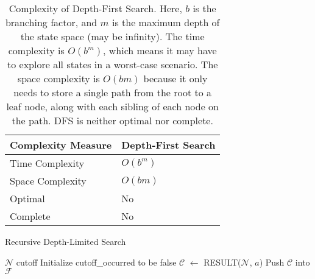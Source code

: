 \documentclass[a4paper,UKenglish,cleveref, autoref, thm-restate]{qlinhta}
\begin{document}
\begin{table}[H]
\centering
\begin{tabular}{|l|l|}
\hline
\textbf{Complexity Measure} & \textbf{Depth-First Search} \\
\hline
Time Complexity & $O(b^m)$ \\
\hline
Space Complexity & $O(bm)$ \\
\hline
Optimal & No \\
\hline
Complete & No \\
\hline
\end{tabular}
\caption{Complexity of Depth-First Search. Here, $b$ is the branching factor, and $m$ is the maximum depth of the state space (may be infinity). The time complexity is $O(b^m)$, which means it may have to explore all states in a worst-case scenario. The space complexity is $O(bm)$ because it only needs to store a single path from the root to a leaf node, along with each sibling of each node on the path. DFS is neither optimal nor complete.}
\label{tab:dfs_complexity_detailed}
\end{table}

\begin{algorithm}[H]
\caption{Recursive Depth-Limited Search}\label{alg:recursive_dls}
\begin{algorithmic}[1]
        \State \Return $\mathcal{N}$
        \State \Return cutoff
    \Else
        \State Initialize cutoff\_occurred to be false
            \State $\mathcal{C}$ $\gets$ RESULT($\mathcal{N}$, $a$)
                \State Push $\mathcal{C}$ into $\mathcal{F}$
            \EndIf
        \EndFor
    \EndIf
\EndFunction
\end{algorithmic}
\end{algorithm}
\end{document}
